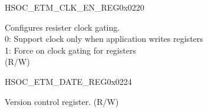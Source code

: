 \begin{register}{H}{SOC\_ETM\_CLK\_EN\_REG}{0x0220}\label{regdesc:SOCETMCLKENREG}
%
%
\regnewline%
\begin{regdesc}\begin{reglist}
\label{fielddesc:SOCETMCLKEN}\item [SOC\_ETM\_CLK\_EN] Configures resister clock gating.\\
0: Support clock only when application writes registers\\
1: Force on clock gating for registers\\ (R/W)
\end{reglist}\end{regdesc}
\end{register}


\begin{register}{H}{SOC\_ETM\_DATE\_REG}{0x0224}\label{regdesc:SOCETMDATEREG}
%
%
\regnewline%
\begin{regdesc}\begin{reglist}
\label{fielddesc:SOCETMDATE}\item [SOC\_ETM\_DATE] Version control register. (R/W)
\end{reglist}\end{regdesc}
\end{register}

